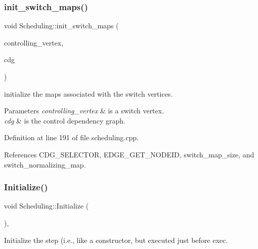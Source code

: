 \subsubsection{\texorpdfstring{init\+\_\+switch\+\_\+maps()}{init\_switch\_maps()}}
{\footnotesize\ttfamily void Scheduling\+::init\+\_\+switch\+\_\+maps (\begin{DoxyParamCaption}\item[{\hyperlink{graph_8hpp_abefdcf0544e601805af44eca032cca14}{vertex}}]{controlling\+\_\+vertex,  }\item[{const \hyperlink{op__graph_8hpp_a9a0b240622c47584bee6951a6f5de746}{Op\+Graph\+Const\+Ref}}]{cdg }\end{DoxyParamCaption})\hspace{0.3cm}{\ttfamily [protected]}}



initialize the maps associated with the switch vertices. 


\begin{DoxyParams}{Parameters}
{\em controlling\+\_\+vertex} & is a switch vertex. \\
\hline
{\em cdg} & is the control dependency graph. \\
\hline
\end{DoxyParams}


Definition at line 191 of file scheduling.\+cpp.



References C\+D\+G\+\_\+\+S\+E\+L\+E\+C\+T\+OR, E\+D\+G\+E\+\_\+\+G\+E\+T\+\_\+\+N\+O\+D\+E\+ID, switch\+\_\+map\+\_\+size, and switch\+\_\+normalizing\+\_\+map.

\mbox{\label{classScheduling_a178619eced00400e3a023a0b32784f8d}} 
\subsubsection{\texorpdfstring{Initialize()}{Initialize()}}
{\footnotesize\ttfamily void Scheduling\+::\+Initialize (\begin{DoxyParamCaption}{ }\end{DoxyParamCaption})\hspace{0.3cm}{\ttfamily [override]}, {\ttfamily [virtual]}}



Initialize the step (i.\+e., like a constructor, but executed just before exec. 



